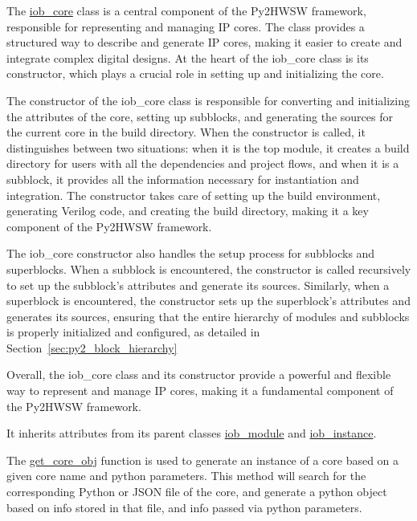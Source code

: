 %

The \href{https://github.com/IObundle/py2hwsw/blob/main/py2hwsw/scripts/iob_core.py}{iob\_core} class is a central component of the Py2HWSW framework, responsible for representing and managing IP cores. The class provides a structured way to describe and generate IP cores, making it easier to create and integrate complex digital designs. At the heart of the iob\_core class is its constructor, which plays a crucial role in setting up and initializing the core.

The constructor of the iob\_core class is responsible for converting and initializing the attributes of the core, setting up subblocks, and generating the sources for the current core in the build directory. When the constructor is called, it distinguishes between two situations: when it is the top module, it creates a build directory for users with all the dependencies and project flows, and when it is a subblock, it provides all the information necessary for instantiation and integration. The constructor takes care of setting up the build environment, generating Verilog code, and creating the build directory, making it a key component of the Py2HWSW framework.

The iob\_core constructor also handles the setup process for subblocks and superblocks. When a subblock is encountered, the constructor is called recursively to set up the subblock's attributes and generate its sources. Similarly, when a superblock is encountered, the constructor sets up the superblock's attributes and generates its sources, ensuring that the entire hierarchy of modules and subblocks is properly initialized and configured, as detailed in Section~\ref{sec:py2_block_hierarchy}

Overall, the iob\_core class and its constructor provide a powerful and flexible way to represent and manage IP cores, making it a fundamental component of the Py2HWSW framework.

It inherits attributes from its parent classes \href{https://github.com/IObundle/py2hwsw/blob/main/py2hwsw/scripts/iob_module.py}{iob\_module} and \href{https://github.com/IObundle/py2hwsw/blob/main/py2hwsw/scripts/iob_instance.py}{iob\_instance}.


The \href{https://github.com/IObundle/py2hwsw/blob/main/py2hwsw/scripts/iob_core.py#L858}{get\_core\_obj} function is used to generate an instance of a core based on a given core name and python parameters.
This method will search for the corresponding Python or JSON file of the core, and generate a python object based on info stored in that file, and info passed via python parameters.

